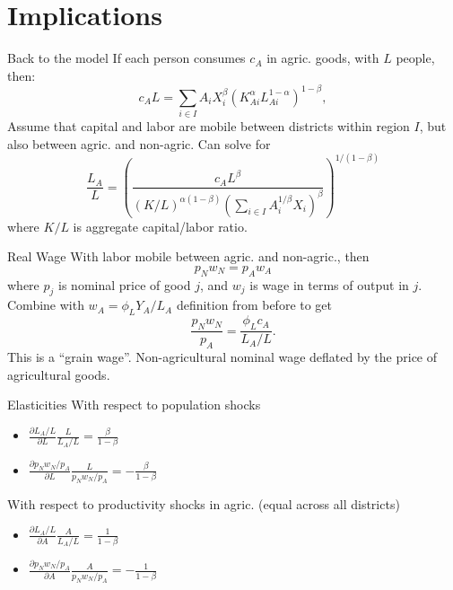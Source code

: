 \documentclass[10pt, xcolor=dvipsnames]{beamer}
\begin{document}
\section{Implications}

\begin{frame}{Back to the model}
If each person consumes $c_A$ in agric. goods, with $L$ people, then:
\begin{equation}
c_A L = \sum_{i \in I} A_{i} X_{i}^{\beta} \left(K_{Ai}^{\alpha}L_{Ai}^{1-\alpha}\right)^{1-\beta}, \label{EQ_caL}
\end{equation}
Assume that capital and labor are mobile between districts within region $I$, but also between agric. and non-agric. Can solve for
\begin{equation}
\frac{L_{A}}{L} = \left(\frac{c_A L^{\beta}}{(K/L)^{\alpha(1-\beta)} \left(\sum_{i \in I} A_i^{1/\beta} X_i\right)^{\beta}} \right)^{1/(1-\beta)} \label{EQ_LaL}
\end{equation}
where $K/L$ is aggregate capital/labor ratio.
\end{frame}

\begin{frame}{Real Wage}
With labor mobile between agric. and non-agric., then 
\begin{equation}
    p_N w_N = p_A w_A
\end{equation}
where $p_j$ is nominal price of good $j$, and $w_j$ is wage in terms of output in $j$. Combine with $w_A = \phi_L Y_A/L_A$ definition from before to get
\begin{equation}
    \frac{p_N w_N}{p_A} = \frac{\phi_L c_A}{L_A/L}. \label{EQ_realwage}
\end{equation}
This is a ``grain wage''. Non-agricultural nominal wage deflated by the price of agricultural goods. 
\end{frame}

\begin{frame}{Elasticities}
With respect to population shocks
\begin{itemize}
  \item $\frac{\partial L_A/L}{\partial L}\frac{L}{L_A/L} = \frac{\beta}{1-\beta}$
  \item $\frac{\partial p_Nw_N/p_A}{\partial L}\frac{L}{p_Nw_N/p_A} = -\frac{\beta}{1-\beta}$
\end{itemize}
With respect to productivity shocks in agric. (equal across all districts)
\begin{itemize}
  \item $\frac{\partial L_A/L}{\partial A}\frac{A}{L_A/L} = \frac{1}{1-\beta}$
  \item $\frac{\partial p_Nw_N/p_A}{\partial A}\frac{A}{p_Nw_N/p_A} = -\frac{1}{1-\beta}$
\end{itemize}
\end{frame}
\end{document}
